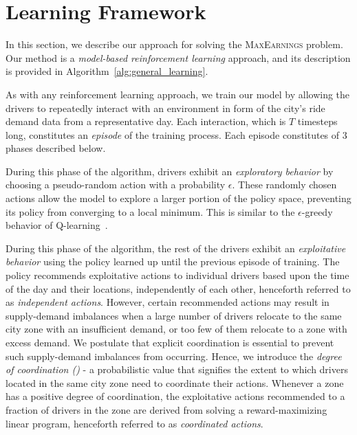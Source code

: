 
\section{Learning Framework}
\label{sec:approach}
In this section, we describe our approach for solving the \textsc{MaxEarnings} 
    problem.
Our method is a \emph{model-based reinforcement learning} approach, and its 
    description is provided in Algorithm~\ref{alg:general_learning}. 
 
As with any reinforcement learning approach, we train our model by
    allowing the drivers to repeatedly interact with an environment 
    in form of the city's ride demand data from a representative day.
Each interaction, which is $T$ timesteps long, constitutes an \emph{episode}
    of the training process.
Each episode constitutes of 3 phases described below.



During this phase of the algorithm, drivers exhibit an
    \emph{exploratory behavior} by choosing a pseudo-random action 
    with a probability $\epsilon$.
These randomly chosen actions allow the model to explore a larger portion of
    the policy space, preventing its policy from converging to a local
    minimum.
This is similar to the $\epsilon$-greedy behavior of
    Q-learning~\cite{Sutton1998-wd}.

During this phase of the algorithm, the rest of the drivers
    exhibit an \emph{exploitative behavior} using the policy learned up until 
    the previous episode of training.
The policy recommends exploitative actions to individual drivers based upon 
    the time of the day and their locations, independently of each other,
    henceforth referred to as \emph{independent actions}.
However, certain recommended actions may result in supply-demand imbalances
    when a large number of drivers relocate to the same city zone with an
    insufficient demand, or too few of them relocate to a zone with excess 
    demand.
We postulate that explicit coordination is essential to prevent such
    supply-demand imbalances from occurring.
Hence, we introduce the \emph{degree of coordination ({\coordination})} - a 
    probabilistic value that signifies the extent to which drivers located in 
    the same city zone need to coordinate their actions.
Whenever a zone has a positive degree of coordination, the exploitative actions
    recommended to a {\coordination} fraction of drivers in the zone are derived
    from solving a reward-maximizing linear program, henceforth referred to as
    \emph{coordinated actions}.

